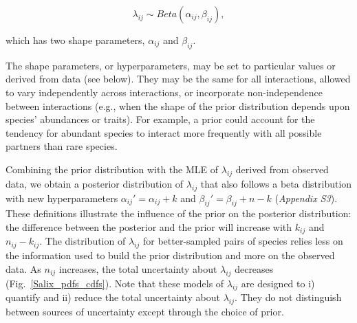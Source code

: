 \documentclass[12pt]{article}
\begin{document}
\begin{spacing}{2.0}
    \begin{equation}
          \lambda_{ij} \sim Beta(\alpha_{ij},\beta_{ij}) , \label{prior}
        \end{equation}

        \noindent which has two shape parameters, $\alpha_{ij}$ and $\beta_{ij}$. 


    The shape parameters, or hyperparameters, may be set to particular values or derived from data (see below). They may be the same for all interactions, allowed to vary independently across interactions, or incorporate non-independence between interactions (e.g., when the shape of the prior distribution depends upon species' abundances or traits). For example, a prior could account for the tendency for abundant species to interact more frequently with all possible partners than rare species.


    Combining the prior distribution with the MLE of $\lambda_{ij}$ derived from observed data, we obtain a posterior distribution of $\lambda_{ij}$ that also follows a beta distribution with new hyperparameters $\alpha_{ij}'=\alpha_{ij}+k$ and $\beta_{ij}'=\beta_{ij}+n-k$ (\emph{Appendix S3}). These definitions illustrate the influence of the prior on the posterior distribution: the difference between the posterior and the prior will increase with $k_{ij}$ and $n_{ij}-k_{ij}$. The distribution of $\lambda_{ij}$ for better-sampled pairs of species relies less on the information used to build the prior distribution and more on the observed data. As $n_{ij}$ increases, the total uncertainty about $\lambda_{ij}$ decreases (Fig.~\ref{Salix_pdfs_cdfs}). Note that these models of $\lambda_{ij}$ are designed to i) quantify and ii) reduce the total uncertainty about $\lambda_{ij}$. They do not distinguish between sources of uncertainty except through the choice of prior.






\end{spacing}
\end{document}

